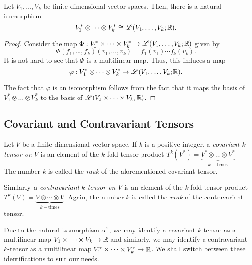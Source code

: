 \begin{theorem}
    Let $V_1,\dots,V_k$ be finite dimensional vector spaces. Then, there is a natural isomorphism 
    \begin{equation*}
        V_1^*\otimes\dots\otimes V_k^*\cong\mathscr L(V_1,\dots,V_k; \mathbb{R}).
    \end{equation*}
\end{theorem}
\begin{proof}
    Consider the map $\Phi: V_1^*\times\dots\times V_k^*\to\mathscr L(V_1,\dots,V_k;\mathbb{R})$ given by 
    \begin{equation*}
        \Phi(f_1,\dots,f_k)(v_1,\dots,v_k) = f_1(v_1)\cdots f_k(v_k).
    \end{equation*}
    It is not hard to see that $\Phi$ is a multilinear map. Thus, this induces a map $$\varphi: V_1^*\otimes\cdots\otimes V_k^*\to\mathscr L(V_1,\dots,V_k;\mathbb{R}).$$ 
    
    The fact that $\varphi$ is an isomorphism follows from the fact that it maps the basis of $V_1^*\otimes\dots\otimes V_k^*$ to the basis of $\mathscr L(V_1\times\dots\times V_k,\mathbb{R})$.
\end{proof}

\subsection{Covariant and Contravariant Tensors}

\begin{definition}
    Let $V$ be a finite dimensional vector space. If $k$ is a positive integer, a \emph{covariant $k$-tensor on $V$} is an element of the $k$-fold tensor product $T^k(V^*) = \underbrace{V^*\otimes\dots\otimes V^*}_{k-\text{times}}$. The number $k$ is called the \emph{rank} of the aforementioned covariant tensor.

    Similarly, a \emph{contravariant $k$-tensor on $V$} is an element of the $k$-fold tensor product $T^k(V) = \underbrace{V\otimes\cdots\otimes V}_{k-\text{times}}$. Again, the number $k$ is called the \emph{rank} of the contravariant tensor.
\end{definition}

Due to the natural isomorphism of , we may identify a covariant $k$-tensor as a multilinear map $V_1\times\dots\times V_k\to\mathbb{R}$ and similarly, we may identify a contravariant $k$-tensor as a multilinear map $V_1^*\times\dots\times V_k^*\to\mathbb{R}$. We shall switch between these identifications to suit our needs.

